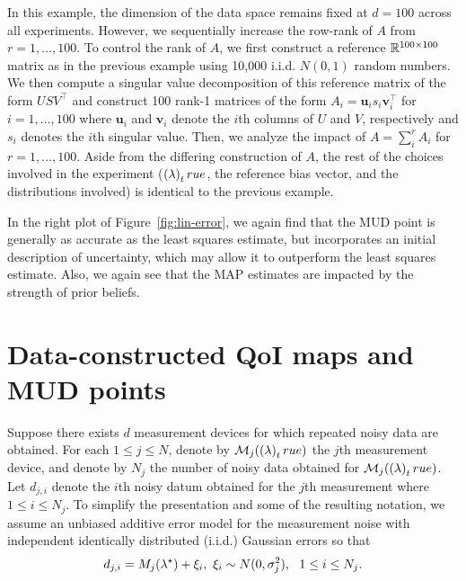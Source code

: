 In this example, the dimension of the data space remains fixed at $d=100$ across all experiments.
However, we sequentially increase the row-rank of $A$ from $r=1, \ldots, 100$.
To control the rank of $A$, we first construct a reference $\mathbb{R}^{100\times 100}$ matrix as in the previous example using 10,000 i.i.d. $N(0,1)$ random numbers.
We then compute a singular value decomposition of this reference matrix of the form $USV^\top$ and construct 100 rank-1 matrices of the form $A_i=\mathbf{u}_i s_i \mathbf{v}_i^\top$ for $i=1,\ldots,100$ where $\mathbf{u}_i$ and $\mathbf{v}_i$ denote the $i$th columns of $U$ and $V$, respectively and $s_i$ denotes the $i$th singular value.
Then, we analyze the impact of $A = \sum_i^r A_i$ for $r=1,\ldots,100$.
Aside from the differing construction of $A$, the rest of the choices involved in the experiment ($\left ( \lambda \right )_true$, the reference bias vector, and the distributions involved) is identical to the previous example.

In the right plot of Figure~\ref{fig:lin-error}, we
again find that the MUD point is generally as accurate as the least squares estimate, but incorporates an initial description of uncertainty, which may allow it to outperform the least squares estimate.
Also, we again see that the MAP estimates are impacted by the strength of prior beliefs.



\section{Data-constructed QoI maps and MUD points}\label{sec:data-maps}

Suppose there exists $d$ measurement devices for which repeated noisy data are obtained.
For each $1\leq j\leq N$, denote by $\mathcal{M}_j(\left ( \lambda \right )_true)$ the $j$th measurement device, and denote by $N_j$ the number of noisy data obtained for $\mathcal{M}_j(\left ( \lambda \right )_true)$.
Let $d_{j,i}$ denote the $i$th noisy datum obtained for the $j$th measurement where $1\leq i\leq N_j$.
To simplify the presentation and some of the resulting notation, we assume an unbiased additive error model for the measurement noise with independent identically distributed (i.i.d.) Gaussian errors so that
\begin{equation}\label{eq:obs_data_error}
	d_{j,i} = M_j(\param^\star) + \xi_i, \ \xi_i\sim N(0,\sigma_j^2), \ \ 1\leq i\leq N_j.
\end{equation}

